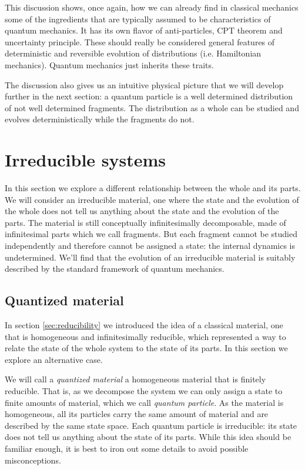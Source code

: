 \documentclass[aps,pra,10pt,twocolumn,floatfix,nofootinbib]{revtex4-1}
\numberwithin{equation}{section}
\theoremstyle{definition}
\begin{document}
This discussion shows, once again, how we can already find in classical mechanics some of the ingredients that are typically assumed to be characteristics of quantum mechanics. It has its own flavor of anti-particles, CPT theorem and uncertainty principle. These should really be considered general features of deterministic and reversible evolution of distributions (i.e. Hamiltonian mechanics). Quantum mechanics just inherits these traits.

The discussion also gives us an intuitive physical picture that we will develop further in the next section: a quantum particle is a well determined distribution of not well determined fragments. The distribution as a whole can be studied and evolves deterministically while the fragments do not.

\section{Irreducible systems}
\label{sec:irreducibility}

In this section we explore a different relationship between the whole and its parts. We will consider an irreducible material, one where the state and the evolution of the whole does not tell us anything about the state and the evolution of the parts. The material is still conceptually infinitesimally decomposable, made of infinitesimal parts which we call fragments. But each fragment cannot be studied independently and therefore cannot be assigned a state: the internal dynamics is undetermined. We'll find that the evolution of an irreducible material is suitably described by the standard framework of quantum mechanics.

\subsection{Quantized material}

In section \ref{sec:reducibility} we introduced the idea of a classical material, one that is homogeneous and infinitesimally reducible, which represented a way to relate the state of the whole system to the state of its parts. In this section we explore an alternative case.

We will call a \emph{quantized material} a homogeneous material that is finitely reducible. That is, as we decompose the system we can only assign a state to finite amounts of material, which we call \emph{quantum particle}. As the material is homogeneous, all its particles carry the same amount of material and are described by the same state space. Each quantum particle is irreducible: its state does not tell us anything about the state of its parts. While this idea should be familiar enough, it is best to iron out some details to avoid possible misconceptions.
\end{document}
